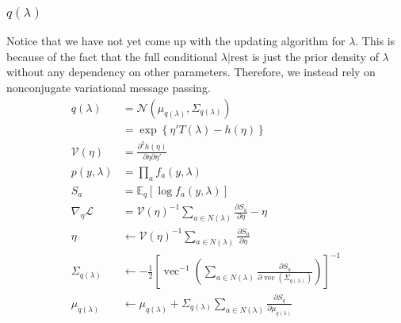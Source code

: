 \documentclass[11pt]{article}
\newcommand{\opn}{\operatorname}
\begin{document}
\subsubsection{$q\left(\lambda\right)$}
Notice that we have not yet come up with the updating algorithm for $\lambda$. This is because of the fact that the full conditional $\lambda|\text{rest}$ is just the prior density of $\lambda$ without any dependency on other parameters. Therefore, we instead rely on nonconjugate variational message passing.
\begin{align*}
  q\left(\lambda\right) &= \mathcal{N}\left(\mu_{q\left(\lambda\right)}, \Sigma_{q\left(\lambda\right)} \right)\\
  &= \exp \left\{\eta'T\left(\lambda\right) - h\left(\eta\right) \right\}\\
  \mathcal{V}\left(\eta\right) &= \frac{\partial^{2}h\left(\eta\right)}{\partial \eta \partial \eta'}\\
  p\left(y, \lambda\right) &= \prod_{a} f_{a}\left(y, \lambda\right)\\
  S_{a} &= \mathbb{E}_{q}\left[\log f_{a}\left(y, \lambda\right) \right]\\
  \nabla_{\eta}\mathcal{L} &= \mathcal{V}\left(\eta\right)^{-1} \sum_{a\in N\left(\lambda\right)}  \frac{\partial S_{a}}{\partial \eta} - \eta\\
  \eta &\leftarrow \mathcal{V}\left(\eta\right)^{-1}\sum_{a\in N\left(\lambda\right)} \frac{\partial S_{a}}{\partial \eta}\\
  \Sigma_{q\left(\lambda\right)} &\leftarrow -\frac{1}{2}\left[\opn{vec}^{-1}\left(\sum_{a\in N\left(\lambda\right)} \frac{\partial S_{a}}{\partial \opn{vec}\left(\Sigma_{q\left(\lambda\right)}\right)} \right) \right]^{-1}\\
  \mu_{q\left(\lambda\right)} &\leftarrow \mu_{q\left(\lambda\right)} +\Sigma_{q\left(\lambda\right)}\sum_{a\in N\left(\lambda\right)} \frac{\partial S_{q}}{\partial \mu_{q\left(\lambda\right)}}
\end{align*}
\end{document}
